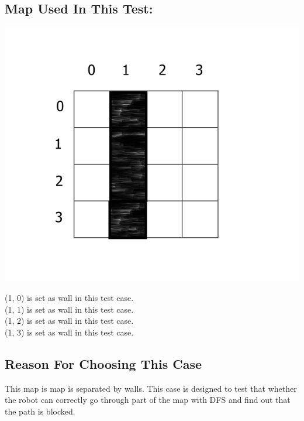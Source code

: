 \documentclass[11pt, a4paper]{report}
\begin{document}
\subsection{Map Used In This Test:}
\begin{center}
\includegraphics[scale=0.4]{./image/Test5.png}
\end{center}

\noindent (1, 0) is set as wall in this test case.\\
(1, 1) is set as wall in this test case.\\
(1, 2) is set as wall in this test case.\\
(1, 3) is set as wall in this test case.\\

\subsection{Reason For Choosing This Case}
This map is map is separated by walls. This case is designed to test that whether the robot can correctly go through part of the map with DFS and find out that the path is blocked.
\end{document}
